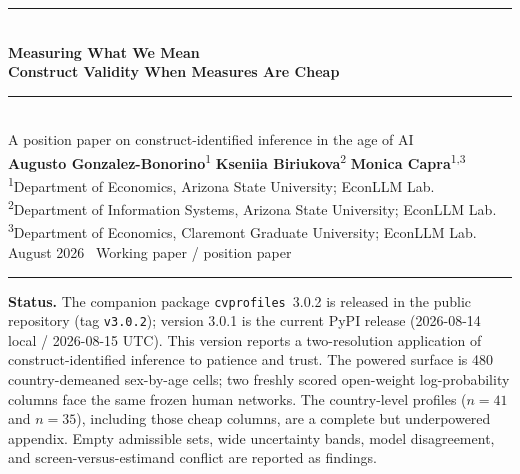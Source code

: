 \documentclass[10pt,letterpaper]{article}
\newcommand{\cvp}{\texttt{cvprofiles}}
\begin{document}
\thispagestyle{empty}
\begin{center}
\vspace*{1.1cm}
{\color{econblue}\rule{\textwidth}{1.15pt}}\\[0.45em]
{\LARGE\bfseries\color{econblue} Measuring What We Mean}\\[0.16em]
{\LARGE\bfseries\color{econblue} Construct Validity When Measures Are Cheap}\\[0.45em]
{\color{econblue}\rule{\textwidth}{0.55pt}}\\[0.75em]
{\large A position paper on construct-identified inference in the age of AI}\\[0.95em]
{\large\textbf{Augusto Gonzalez-Bonorino}\textsuperscript{1}\quad
\textbf{Kseniia Biriukova}\textsuperscript{2}\quad
\textbf{Monica Capra}\textsuperscript{1,3}}\\[0.5em]
{\small\textsuperscript{1}Department of Economics, Arizona State University; EconLLM Lab.\\
\textsuperscript{2}Department of Information Systems, Arizona State University; EconLLM Lab.\\
\textsuperscript{3}Department of Economics, Claremont Graduate University; EconLLM Lab.}\\[0.75em]
{\normalsize August 2026 \textperiodcentered\ Working paper / position paper}\\[0.35em]
{\color{econblue}\rule{0.28\textwidth}{0.35pt}}
\end{center}

\vspace{0.6em}

\noindent\colorbox{mist}{\parbox{0.965\textwidth}{\small\vspace{0.3em}
\textbf{Status.}
The companion package \cvp{}~3.0.2 is released in the public repository (tag \texttt{v3.0.2}); version 3.0.1 is the current PyPI release (2026-08-14 local / 2026-08-15 UTC).
This version reports a two-resolution application of construct-identified inference to patience and trust.
The powered surface is 480 country-demeaned sex-by-age cells; two freshly scored open-weight log-probability columns face the same frozen human networks.
The country-level profiles ($n=41$ and $n=35$), including those cheap columns, are a complete but underpowered appendix.
Empty admissible sets, wide uncertainty bands, model disagreement, and screen-versus-estimand conflict are reported as findings.
\vspace{0.3em}}}
\end{document}
